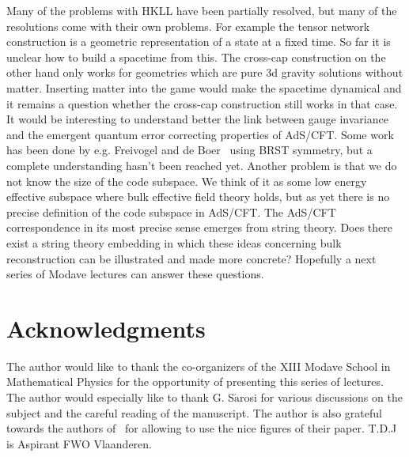 \documentclass{PoS}
\begin{document}
Many of the problems with HKLL have been partially resolved, but many of the resolutions come with their own problems. For example the tensor network construction is a geometric representation of a state at a fixed time. So far it is unclear how to build a spacetime from this. The cross-cap construction on the other hand only works for geometries which are pure 3d gravity solutions without matter. Inserting matter into the game would make the spacetime dynamical and it remains a question whether the cross-cap construction still works in that case. It would be interesting to understand better the link between gauge invariance and the emergent quantum error correcting properties of AdS/CFT. Some work has been done by e.g. Freivogel and de Boer~\cite{deBoer:2016yiz,Freivogel:2016zsb} using BRST symmetry, but a complete understanding hasn't been reached yet. Another problem is that we do not know the size of the code subspace. We think of it as some low energy effective subspace where bulk effective field theory holds, but as yet there is no precise definition of the code subspace in AdS/CFT. The AdS/CFT correspondence in its most precise sense emerges from string theory. Does there exist a string theory embedding in which these ideas concerning bulk reconstruction can be illustrated and made more concrete? Hopefully a next series of Modave lectures can answer these questions.

\section*{Acknowledgments}
The author would like to thank the co-organizers of the XIII Modave School in Mathematical Physics for the opportunity of presenting this series of lectures. The author would especially like to thank G. S$\acute{\text{a}}$rosi for various discussions on the subject and the careful reading of the manuscript. The author is also grateful towards the authors of~\cite{Pastawski:2015qua} for allowing to use the nice figures of their paper. T.D.J is Aspirant FWO Vlaanderen.
\end{document}
